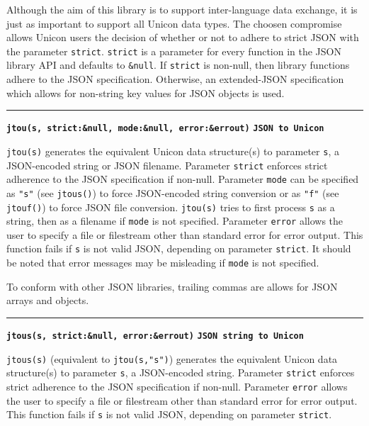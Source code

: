 \documentclass[letterpaper,12pt]{article}
\begin{document}
Although the aim of this library is to support inter-language data exchange, 
it is just as important to support all Unicon data types. The choosen compromise
allows Unicon users the decision of whether or not to adhere to strict JSON
with the parameter \texttt{strict}. \texttt{strict} is a parameter for 
every function in the JSON library API and defaults to \texttt{\&null}. If
\texttt{strict} is non-null, then library functions adhere to the JSON
specification. Otherwise, an extended-JSON specification which allows for
non-string key values for JSON objects is used.

\bigskip
\hrule\vspace{0.1cm}
\noindent
{\tt\bf jtou(s, strict:\&null, mode:\&null, error:\&errout)} \hfill {\tt\bf JSON to Unicon}

\vspace{0.1cm}
\noindent
\texttt{jtou(s)} generates the equivalent Unicon data structure(s) to
parameter \texttt{s}, a JSON-encoded string or JSON filename. 
Parameter \texttt{strict} enforces strict adherence to the JSON specification 
if non-null.
Parameter \texttt{mode} can be specified as \texttt{"s"} (see \texttt{jtous()}) 
to force JSON-encoded string conversion or as \texttt{"f"} 
(see \texttt{jtouf()}) to force JSON file conversion.
\texttt{jtou(s)} tries to first process \texttt{s} as a string, then as a 
filename if \texttt{mode} is not specified. 
Parameter \texttt{error} allows the user to specify a file or filestream other 
than standard error for error output. 
This function fails if \texttt{s} is not valid JSON, depending on parameter 
\texttt{strict}.
It should be noted that error messages may be misleading if \texttt{mode}
is not specified.

To conform with other JSON libraries, trailing commas are allows for JSON arrays
and objects.

\bigskip
\hrule\vspace{0.1cm}
\noindent
{\tt\bf jtous(s, strict:\&null, error:\&errout)} \hfill {\tt\bf JSON string to Unicon}

\vspace{0.1cm}
\noindent
\texttt{jtous(s)} (equivalent to \texttt{jtou(s,"s")}) generates the
equivalent Unicon data structure(s) to parameter \texttt{s}, a JSON-encoded 
string. 
Parameter \texttt{strict} enforces strict adherence to the JSON specification 
if non-null.
Parameter \texttt{error} allows the user to specify a file or filestream other 
than standard error for error output. 
This function fails if \texttt{s} is not valid JSON, depending on parameter 
\texttt{strict}.
\end{document}
